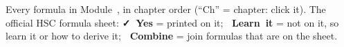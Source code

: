 \label{ess:fs:chap}

\newcommand\essfsYes{\textcolor{hscformula}{\footnotesize\bfseries\faCheck\ Yes}}
\newcommand\essfsNo{\textcolor{hscmistake}{\footnotesize\bfseries\faTimes\ Learn it}}
\newcommand\essfsComb{\textcolor{hsctiptext}{\footnotesize\bfseries\faLink\ Combine}}
\newcommand\essfsch[1]{\hyperref[ch#1:chap]{\textcolor{hscbrand}{\bfseries #1}}}
\newcommand\essfspad[1]{\raisebox{0pt}[\dimexpr\height+0.7ex\relax][\dimexpr\depth+0.5ex\relax]{#1}}
\newcommand\essfsrow[4]{\rule[-1.2ex]{0pt}{3.8ex}\essfspad{#2} & #3 & #1 & #4\\\hline}
\newcommand\essfsstack[1]{\begin{tabular}{@{}c@{}}#1\end{tabular}}
\newcommand\essfsnext{\noalign{\vskip-\arrayrulewidth}\arrayrulecolor{hscbrand}%
  \specialrule{0.7pt}{0pt}{0pt}\arrayrulecolor{hscrule}}
\newcommand\essfshead{\colhead{Formula} & \colhead{What it is for} &
  \colhead{On the sheet} & \colhead{Ch}}

Every formula in Module~\modulenumber, in chapter order (``Ch'' = chapter: click it). The
official HSC formula sheet: \mbox{\essfsYes} = printed on it; \mbox{\essfsNo} = not on it, so
learn it or how to derive it; \mbox{\essfsComb} = join formulas that are on the sheet.

